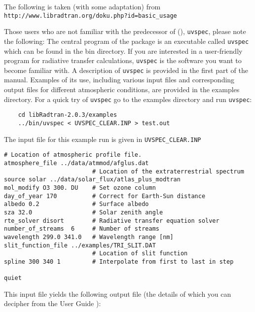 The following is taken (with some adaptation) from \\
\lstinline{http://www.libradtran.org/doku.php?id=basic_usage}

Those users who are not familiar with the predecessor of \libradtran(), \lstinline{uvspec}, please note the following: The central program of the package is an executable called \lstinline{uvspec} which can be found in the bin directory. If you are interested in a user-friendly program for radiative transfer calculations, \lstinline{uvspec} is the software you want to become familiar with. A description of \lstinline{uvspec} is provided in the first part of the manual. Examples of its use, including various input files and corresponding output files for different atmospheric conditions, are provided in the examples directory. For a quick try of \lstinline{uvspec} go to the examples directory and run \lstinline{uvspec}:

\begin{lstlisting}
    cd libRadtran-2.0.3/examples
    ../bin/uvspec < UVSPEC_CLEAR.INP > test.out
\end{lstlisting}



The input file for this example run is given in \lstinline{UVSPEC_CLEAR.INP}

\begin{lstlisting}[style=tinysize]
                         # Location of atmospheric profile file. 
atmosphere_file ../data/atmmod/afglus.dat
                         # Location of the extraterrestrial spectrum
source solar ../data/solar_flux/atlas_plus_modtran
mol_modify O3 300. DU    # Set ozone column
day_of_year 170          # Correct for Earth-Sun distance
albedo 0.2               # Surface albedo
sza 32.0                 # Solar zenith angle
rte_solver disort        # Radiative transfer equation solver
number_of_streams  6     # Number of streams
wavelength 299.0 341.0   # Wavelength range [nm]
slit_function_file ../examples/TRI_SLIT.DAT
                         # Location of slit function
spline 300 340 1         # Interpolate from first to last in step

quiet
\end{lstlisting}

This input file yields the following output file (the details of which you can decipher from the \libradtran{} User Guide \cite{libRadTranUserGuide2019}):


